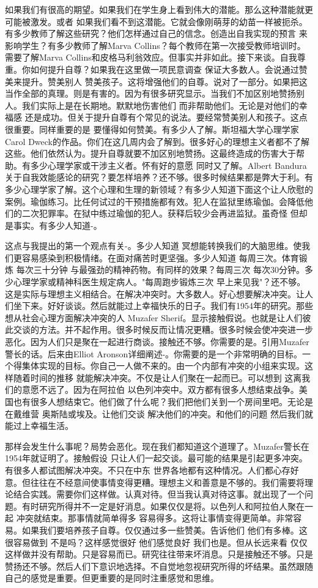 如果我们有很高的期望。如果我们在学生身上看到伟大的潜能。那么这种潜能就更可能被激发。或者 如果我们看不到这潜能。它就会像刚萌芽的幼苗一样被扼杀。有多少教师了解这些研究？他们怎样通过自己的信念。创造出自我实现的预言 来影响学生？有多少教师了解Marva Collins？每个教师在第一次接受教师培训时。需要了解Marva Collins和皮格马利翁效应。但事实并非如此。接下来谈。自我尊重。你如何提升自尊？如果我在这里做一项民意调查 保证大多数人。会说通过赞美来提升。赞美别人 赞美孩子。这将增强他们的自尊。说对了一部分。如果把这当作全部的真理。则是有害的。因为有很多研究显示。当我们不加区别地赞扬别人。我们实际上是在长期地。默默地伤害他们 而非帮助他们。无论是对他们的幸福感 还是成功。但关于提升自尊有个常见的说法。要经常赞美别人和孩子。这点很重要。同样重要的是 要懂得如何赞美。有多少人了解。斯坦福大学心理学家Carol Dweck的作品。你们在这几周内会了解到。很多好心的理想主义者都不了解这些。他们依然认为。提升自尊就要不加区别地赞扬。这最终造成的伤害大于帮助。有多少心理学家或干涉主义者。怀有好的意愿 同时又了解。Albert Bandura关于自我效能感论的研究？要怎样培养？还不够。很多时候结果都是弊大于利。有多少心理学家了解。这个心理和生理的新领域？有多少人知道下面这个让人欣慰的案例。瑜伽练习。比任何试过的干预措施都有效。犯人在监狱里练瑜伽。会降低他们的二次犯罪率。在狱中练过瑜伽的犯人。获释后较少会再进监狱。虽奇怪 但却是事实。有多少人知道-。 

这点与我提出的第一个观点有关-。多少人知道 冥想能转换我们的大脑思维。使我们更容易感染到积极情绪。在面对痛苦时更坚强。多少人知道 每周三次。体育锻炼 每次三十分钟 与最强劲的精神药物。有同样的效果？每周三次 每次30分钟。多少心理学家或精神科医生规定病人。"每周跑步锻炼三次 早上来见我"？还不够。这是实际与理想主义相结合。在解决冲突时。大多数人。好心想要解决冲突。让人们坐下来。好好谈谈。然后就能过上幸福快乐的日子。我们有1954年的研究。那些想从社会心理方面解决冲突的人 Muzafer Sherif。显示接触假说。也就是让人们彼此交谈的方法。并不起作用。很多时候反而让情况更糟。很多时候会使冲突进一步恶化。因为人们只是聚在一起进行商谈。接触还不够。你需要的是。引用Muzafer警长的话。后来由Elliot Aronson详细阐述-。你需要的是一个非常明确的目标。一个得集体实现的目标。你自己一人做不来的。由一个内部有冲突的小组来实现。这样随着时间的推移 就能解决冲突。不仅是让人们聚在一起而已。可以想到 这离我们的意愿不远了。因为在阿拉伯 以色列冲突中。双方都有很多人想结束战争。美国也有很多人想结束它。他们做了什么呢？我们把他们关到一个房间里吧。无论是在戴维营 奥斯陆或埃及。让他们交谈 解决他们的冲突。和他们的问题 然后我们就能过上幸福生活。 

那样会发生什么事呢？局势会恶化。现在我们都知道这个道理了。Muzafer警长在1954年就证明了。接触假设 只让人们一起交谈。最可能的结果是引起更多冲突。有很多人都试图解决冲突。不只在中东 世界各地都有这种情况。人们都心存好意。但往往在不经意间使事情变得更糟。理想主义和善意是不够的。我们需要将理论结合实践。需要你们这样做。认真对待。但当我认真对待这事。就出现了一个问题。有时研究所得并不一定是好消息。如果仅仅是将。以色列人和阿拉伯人聚在一起 冲突就结束。那事情就简单得多 容易得多。这将让事情变得更简单。非常容易。如果我们要培养孩子自尊。仅仅通过多一些赞美。告诉他们 他们有多棒。这很容易做到 不是吗？这样感觉很好 他们感觉良好 我们也是。但从长远来看 仅仅这样做并没有帮助。只是容易而已。研究往往带来坏消息。只是接触还不够。只是赞扬还不够。然后人们下意识地选择。不自觉地忽视研究所得的坏结果。虽然跟随自己的感觉是重要。但更重要的是同时注重感觉和思维。 

